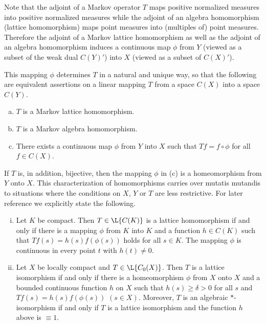 Note that the adjoint of a Markov operator $T$ maps positive normalized measures into positive normalized measures while the adjoint of an algebra homomorphism (lattice homomorphism) maps point measures into (multiples of) point measures.
Therefore the adjoint of a Markov lattice homomorphism as well as the adjoint of an algebra homomorphism induces a continuous map $\phi$ from $Y$ (viewed as a subset of the weak dual $C(Y)'$) into $X$ (viewed as a subset of $C(X)'$).

This mapping $\phi$ determines $T$ in a natural and unique way, so that the following are equivalent assertions on a linear mapping $T$ from a space $C(X)$ into a space $C(Y)$.
\begin{enumerate}[(a)]
\item 
	$T$ is a Markov lattice homomorphism.
\item 
	$T$ is a Markov algebra homomorphism.
\item 
	There exists a continuous map $\phi$ from $Y$ into $X$ such that $Tf = f \circ \phi$ for all $f \in 	C(X)$.
\end{enumerate}
If $T$ is, in addition, bijective, then the mapping $\phi$ in (c) is a homeomorphism from $Y$ onto $X$.
This characterization of homomorphisms carries over mutatis mutandis to situations where the conditions on $X$, $Y$ or $T$ are less restrictive.
For later reference we explicitly state the following.
\begin{enumerate}[(i)]
\item 
	Let $K$ be compact. Then $ T \in \L{C(K)} $ is a lattice homomorphism if and only if there is a mapping 
$\phi$ from $K$ into $K$ and a function $h \in C(K)$ such that $Tf(s) = h(s)f(\phi(s))$ holds for all $s \in K$.
The mapping $\phi$ is continuous in every point $t$ with $h(t) \neq 0$.

\item 
	Let $X$ be locally compact and $T \in \L{C_{0}(X)}$.
Then $T$ is a lattice isomorphism if and only if there is a homeomorphism $\phi$ from $X$ onto $X$ and a bounded continuous function $h$ on $X$ such that $h(s) \geq \delta > 0$ for all $s$ and $Tf(s) = h(s)f(\phi(s))$ $(s \in X)$.
Moreover, $T$ is an algebraic $*$-isomorphism if and only if $T$ is a lattice isomorphism and the function $h$ above is $\equiv 1$.
\end{enumerate}

